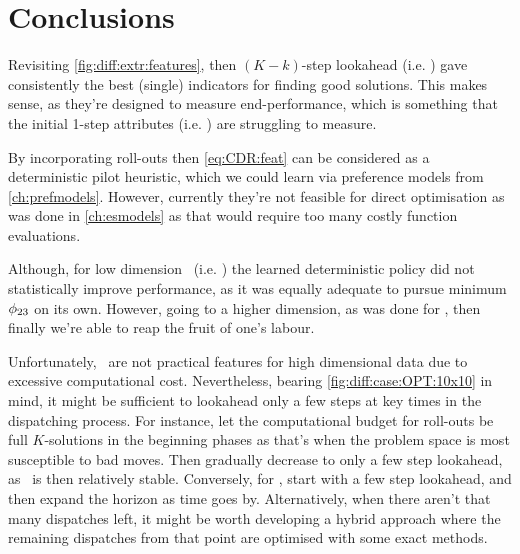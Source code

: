 \section{Conclusions}

Revisiting \cref{fig:diff:extr:features}, then $(K-k)$-step lookahead (i.e. 
\phiGlobalRelated) gave consistently the best (single) indicators for finding 
good solutions. 
This makes sense, as they're designed to measure end-performance, which is 
something that the initial 1-step attributes (i.e. \phiLocalRelated) are 
struggling to measure.

By incorporating roll-outs then \cref{eq:CDR:feat} can be considered as a 
deterministic pilot heuristic, which we could learn via preference models from 
\cref{ch:prefmodels}. However, currently they're not feasible for direct 
optimisation as was done in \cref{ch:esmodels} as that would require too many 
costly function evaluations.

Although, for low dimension \jsp\ (i.e. \ProblemSpace[6\times5]{\train}) the 
learned 
deterministic policy did not statistically improve performance, as it was 
equally adequate to pursue minimum $\phi_{23}$ on its own.
However, going to a higher dimension, as was done for , then finally 
we're able to reap the fruit of one's labour.

Unfortunately, \phiRNDRelated\ are not practical features for high dimensional 
data due to excessive computational cost. 
Nevertheless, bearing \cref{fig:diff:case:OPT:10x10} in mind, it 
might be sufficient to lookahead only a few steps at key times in the 
dispatching process. For instance, let the computational budget for 
 roll-outs be full $K$-solutions in the beginning phases as 
that's when the problem space is most susceptible to bad moves. Then gradually 
decrease to only a few step lookahead, as \fsp\ is then relatively stable.
Conversely, for , start with a few step lookahead, and then 
expand the horizon as time goes by. Alternatively, when there aren't that many 
dispatches left, it might be worth developing a hybrid approach where the 
remaining dispatches from that point are optimised with some exact methods. 
